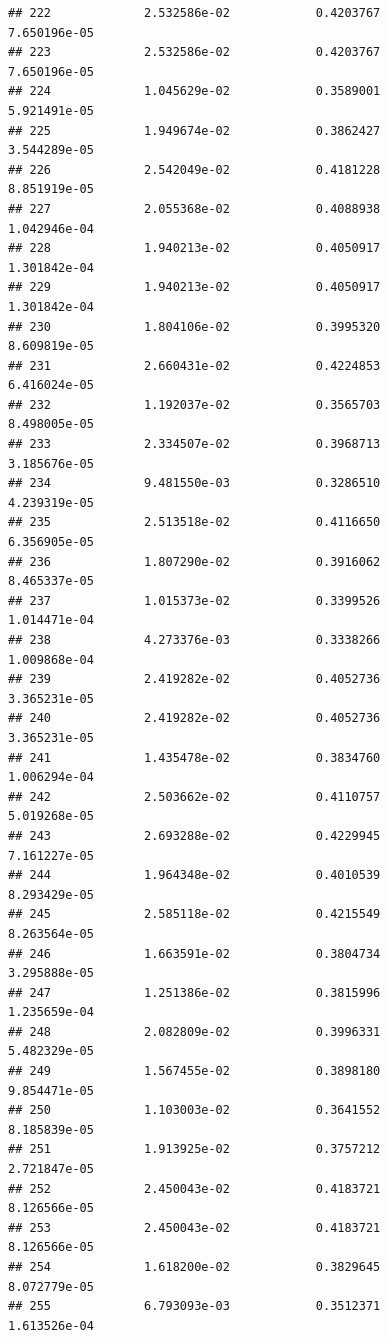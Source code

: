 \documentclass[
]{article}
\begin{document}
\begin{verbatim}
## 222             2.532586e-02            0.4203767            7.650196e-05
## 223             2.532586e-02            0.4203767            7.650196e-05
## 224             1.045629e-02            0.3589001            5.921491e-05
## 225             1.949674e-02            0.3862427            3.544289e-05
## 226             2.542049e-02            0.4181228            8.851919e-05
## 227             2.055368e-02            0.4088938            1.042946e-04
## 228             1.940213e-02            0.4050917            1.301842e-04
## 229             1.940213e-02            0.4050917            1.301842e-04
## 230             1.804106e-02            0.3995320            8.609819e-05
## 231             2.660431e-02            0.4224853            6.416024e-05
## 232             1.192037e-02            0.3565703            8.498005e-05
## 233             2.334507e-02            0.3968713            3.185676e-05
## 234             9.481550e-03            0.3286510            4.239319e-05
## 235             2.513518e-02            0.4116650            6.356905e-05
## 236             1.807290e-02            0.3916062            8.465337e-05
## 237             1.015373e-02            0.3399526            1.014471e-04
## 238             4.273376e-03            0.3338266            1.009868e-04
## 239             2.419282e-02            0.4052736            3.365231e-05
## 240             2.419282e-02            0.4052736            3.365231e-05
## 241             1.435478e-02            0.3834760            1.006294e-04
## 242             2.503662e-02            0.4110757            5.019268e-05
## 243             2.693288e-02            0.4229945            7.161227e-05
## 244             1.964348e-02            0.4010539            8.293429e-05
## 245             2.585118e-02            0.4215549            8.263564e-05
## 246             1.663591e-02            0.3804734            3.295888e-05
## 247             1.251386e-02            0.3815996            1.235659e-04
## 248             2.082809e-02            0.3996331            5.482329e-05
## 249             1.567455e-02            0.3898180            9.854471e-05
## 250             1.103003e-02            0.3641552            8.185839e-05
## 251             1.913925e-02            0.3757212            2.721847e-05
## 252             2.450043e-02            0.4183721            8.126566e-05
## 253             2.450043e-02            0.4183721            8.126566e-05
## 254             1.618200e-02            0.3829645            8.072779e-05
## 255             6.793093e-03            0.3512371            1.613526e-04

\end{verbatim}
\end{document}
